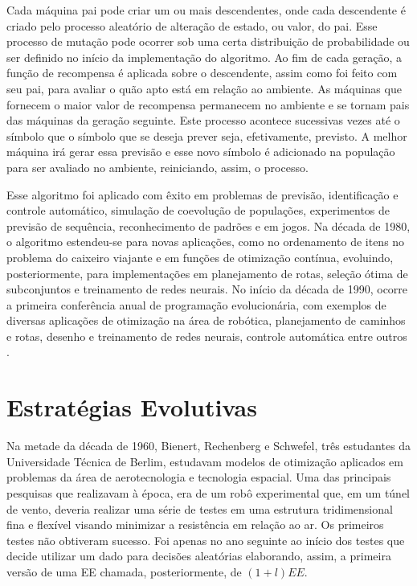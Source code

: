 Cada máquina pai pode criar um ou mais descendentes, onde cada descendente é criado pelo processo aleatório de alteração de estado, ou valor, do pai. Esse processo de mutação pode ocorrer sob uma certa distribuição de probabilidade ou ser definido no início da implementação do algoritmo. Ao fim de cada geração, a função de recompensa é aplicada sobre o descendente, assim como foi feito com seu pai, para avaliar o quão apto está em relação ao ambiente. As máquinas que fornecem o maior valor de recompensa permanecem no ambiente e se tornam pais das máquinas da geração seguinte. Este processo acontece sucessivas vezes até o símbolo que o símbolo que se deseja prever seja, efetivamente, previsto. A melhor máquina irá gerar essa previsão e esse novo símbolo é adicionado na população para ser avaliado no ambiente, reiniciando, assim, o processo.

Esse algoritmo foi aplicado com êxito em problemas de previsão, identificação e controle automático, simulação de coevolução de populações, experimentos de previsão de sequência, reconhecimento de padrões e em jogos. Na década de 1980, o algoritmo estendeu-se para novas aplicações, como no ordenamento de itens no problema do caixeiro viajante e em funções de otimização contínua, evoluindo, posteriormente, para implementações em planejamento de rotas, seleção ótima de subconjuntos e treinamento de redes neurais. No início da década de 1990, ocorre a primeira conferência anual de programação evolucionária, com exemplos de diversas aplicações de otimização na área de robótica, planejamento de caminhos e rotas, desenho e treinamento de redes neurais, controle automática entre outros .

\section{Estratégias Evolutivas} 

Na metade da década de 1960, Bienert, Rechenberg e Schwefel, três estudantes da Universidade Técnica de Berlim, estudavam modelos de otimização aplicados em problemas da área de aerotecnologia e tecnologia espacial. Uma das principais pesquisas que realizavam à época, era de um robô experimental que, em um túnel de vento, deveria realizar uma série de testes em uma estrutura tridimensional fina e flexível visando minimizar a resistência em relação ao ar. Os primeiros testes não obtiveram sucesso. Foi apenas no ano seguinte ao início dos testes que \cite{rechenberg_cybernetic_1965} decide utilizar um dado para decisões aleatórias elaborando, assim, a primeira versão de uma EE \cite[pg.A2.3:6]{back_handbook_1997} chamada, posteriormente, de $(1 + l) EE$. 

